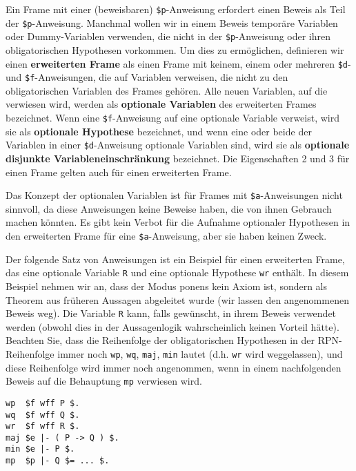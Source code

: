 Ein Frame mit einer (beweisbaren) \texttt{\$p}-Anweisung erfordert einen Beweis als Teil der \texttt{\$p}-Anweisung.  Manchmal wollen wir in einem Beweis temporäre Variablen oder Dummy-Variablen verwenden, die nicht in der \texttt{\$p}-Anweisung oder ihren obligatorischen Hypothesen vorkommen.  Um dies zu ermöglichen, definieren wir einen {\bf erweiterten Frame} als einen Frame mit keinem, einem oder mehreren \texttt{\$d}- und \texttt{\$f}-Anweisungen, die auf Variablen verweisen, die nicht zu den obligatorischen Variablen des Frames gehören.  Alle neuen Variablen, auf die verwiesen wird, werden als {\bf optionale Variablen} des erweiterten Frames bezeichnet. Wenn eine \texttt{\$f}-Anweisung auf eine optionale Variable verweist, wird sie als {\bf optionale Hypothese} bezeichnet, und wenn eine oder beide der Variablen in einer \texttt{\$d}-Anweisung optionale Variablen sind, wird sie als {\bf optionale disjunkte Variableneinschränkung} bezeichnet.  Die Eigenschaften 2 und 3 für einen Frame gelten auch für einen erweiterten Frame.

Das Konzept der optionalen Variablen ist für Frames mit \texttt{\$a}-Anweisungen nicht sinnvoll, da diese Anweisungen keine Beweise haben, die von ihnen Gebrauch machen könnten. Es gibt kein Verbot für die Aufnahme optionaler Hypothesen in den erweiterten Frame für eine \texttt{\$a}-Anweisung, aber sie haben keinen Zweck.

Der folgende Satz von Anweisungen ist ein Beispiel für einen erweiterten Frame, das eine optionale Variable \texttt{R} und eine optionale Hypothese \texttt{wr} enthält.  In diesem Beispiel nehmen wir an, dass der Modus ponens kein Axiom ist, sondern als Theorem aus früheren Aussagen abgeleitet wurde (wir lassen den angenommenen Beweis weg). Die Variable \texttt{R} kann, falls gewünscht, in ihrem Beweis verwendet werden (obwohl dies in der Aussagenlogik wahrscheinlich keinen Vorteil hätte).  Beachten Sie, dass die Reihenfolge der obligatorischen Hypothesen in der RPN-Reihenfolge immer noch \texttt{wp}, \texttt{wq}, \texttt{maj}, \texttt{min} lautet (d.h. \texttt{wr} wird weggelassen), und diese Reihenfolge wird immer noch angenommen, wenn in einem nachfolgenden Beweis auf die Behauptung \texttt{mp} verwiesen wird.

\begin{verbatim}
wp  $f wff P $.
wq  $f wff Q $.
wr  $f wff R $.
maj $e |- ( P -> Q ) $.
min $e |- P $.
mp  $p |- Q $= ... $.
\end{verbatim}

